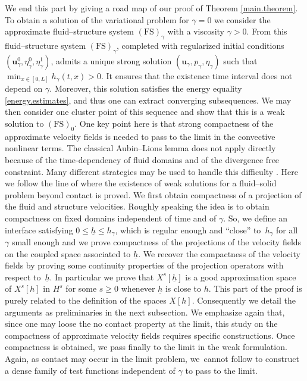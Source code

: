 \documentclass[11pt]{article}
\newcommand{\FS}{\mathrm{FS}}
\theoremstyle{remark}
\theoremstyle{definition}
\newcommand{\ug}{\boldsymbol{u}}
\begin{document}
We end this part by giving a road map of our proof of Theorem \ref{main.theorem}.
To obtain a solution of the variational problem for $\gamma=0$ we consider the approximate fluid--structure system $(\FS)_{\gamma}$ with a viscosity $\gamma>0$. From \cite[Th.\,1]{Grandmont-Hillairet-Lequeurre} this fluid--structure system $(\FS)_{\gamma}$, completed with regularized initial conditions $(\ug^{0}_{\gamma},\eta^{0}_{\gamma},\eta^{1}_{\gamma})$, admits a unique strong solution $(\ug_{\gamma},p_{\gamma},\eta_{\gamma})$ such that $\min_{x\in [0, L]}h_\gamma(t, x)>0$. It ensures that the existence time interval does not depend on $\gamma$. Moreover, this solution satisfies the energy equality \eqref{energy.estimates}, and thus one can extract converging subsequences. 
We may then consider one cluster point of this sequence and show that this is a weak solution to $(\FS)_0$.
One key point here is that strong compactness of the approximate velocity fields is needed to pass to the limit in the convective nonlinear terms. The classical Aubin--Lions lemma does not apply directly because of the time-dependency of fluid domains and of the divergence free constraint. Many different strategies may be used to handle this difficulty \cite{Fujita-Sauer, Grandmont08, Lengeler, Moussa}. Here we follow the line of \cite{SanMartin-Starovoitov-Tucsnak} where the existence of weak solutions for a fluid--solid problem beyond contact is proved. We first obtain compactness of a projection of the fluid and structure velocities. Roughly speaking the idea is to obtain compactness on fixed domains independent of time and of $\gamma$. So, we define an interface satisfying $0\leq\underline{h}\leq h_\gamma$, which is regular enough and ``close'' to~$h_\gamma$ for all $\gamma$ small enough
and we prove compactness of the projections of the velocity fields on the coupled space associated to $\underline{h}$. We recover the
compactness of the velocity fields by proving some continuity properties of the projection operators with respect to~$\underline{h}$. {In particular we prove that $X^{s}[\underline{h}]$ is a good approximation space of $X^{s}[h]$ in $H^s$ for some $s\geq 0$ whenever $\underline{h}$ is close to $h$.}
This part of the proof is purely related to the definition of the spaces $X[h]$. Consequently we detail the arguments as preliminaries in the next subsection. We emphasize again that, since one may loose the no contact property at the limit, this study on the compactness of approximate velocity fields requires specific constructions. Once compactness is obtained, we pass finally to the limit in the weak formulation. Again, as contact may occur in the limit problem, we~cannot follow \cite{Chambolle-etal} to construct a dense family of test functions independent of $\gamma$ to pass to the limit.
\end{document}
